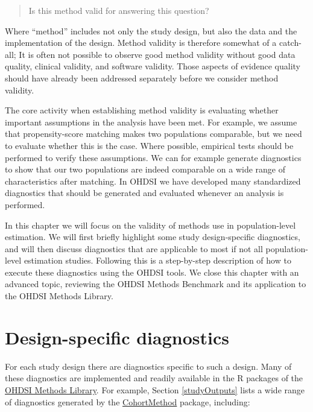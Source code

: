 \documentclass[11pt]{book}
\theoremstyle{definition}
\theoremstyle{definition}
\theoremstyle{definition}
\theoremstyle{remark}
\begin{document}
\begin{quote}
Is this method valid for answering this question?
\end{quote}

Where ``method'' includes not only the study design, but also the data and the implementation of the design. Method validity is therefore somewhat of a catch-all; It is often not possible to observe good method validity without good data quality, clinical validity, and software validity. Those aspects of evidence quality should have already been addressed separately before we consider method validity.

The core activity when establishing method validity is evaluating whether important assumptions in the analysis have been met. For example, we assume that propensity-score matching makes two populations comparable, but we need to evaluate whether this is the case. Where possible, empirical tests should be performed to verify these assumptions. We can for example generate diagnostics to show that our two populations are indeed comparable on a wide range of characteristics after matching. In OHDSI we have developed many standardized diagnostics that should be generated and evaluated whenever an analysis is performed.

In this chapter we will focus on the validity of methods use in population-level estimation. We will first briefly highlight some study design-specific diagnostics, and will then discuss diagnostics that are applicable to most if not all population-level estimation studies. Following this is a step-by-step description of how to execute these diagnostics using the OHDSI tools. We close this chapter with an advanced topic, reviewing the OHDSI Methods Benchmark and its application to the OHDSI Methods Library.

\hypertarget{design-specific-diagnostics}{%
\section{Design-specific diagnostics}\label{design-specific-diagnostics}}

For each study design there are diagnostics specific to such a design. Many of these diagnostics are implemented and readily available in the R packages of the \href{https://ohdsi.github.io/MethodsLibrary/}{OHDSI Methods Library}. For example, Section \ref{studyOutputs} lists a wide range of diagnostics generated by the \href{https://ohdsi.github.io/CohortMethod/}{CohortMethod} package, including:
\end{document}
